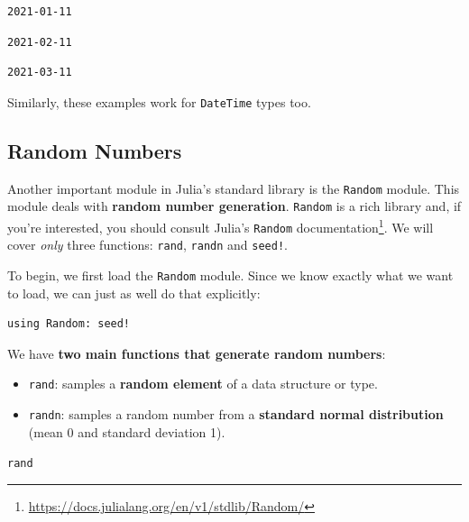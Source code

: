 \documentclass[
  notoc %
]{tufte-book}
\makeatletter
\DeclareRobustCommand{\href}[2]{#2\footnote{\url{#1}}}
\providecommand{\tightlist}{%
  \setlength{\itemsep}{0pt}\setlength{\parskip}{0pt}
}
\newcommand{\passthrough}[1]{#1}
\renewcommand\subsubsection{%
\@startsection{subsubsection}{3}{\z@ }{-3.25ex\@plus -1ex \@minus -.2ex}{1.5ex \@plus .2ex}{\normalfont \normalsize \bfseries }
}
\makeatother
\begin{document}
\begin{lstlisting}[language=Output]
2021-01-11
\end{lstlisting}

\begin{lstlisting}[language=Output]
2021-02-11
\end{lstlisting}

\begin{lstlisting}[language=Output]
2021-03-11
\end{lstlisting}

Similarly, these examples work for \passthrough{\lstinline!DateTime!}
types too.

\hypertarget{sec:random}{%
\subsection{Random Numbers}\label{sec:random}}

Another important module in Julia's standard library is the
\passthrough{\lstinline!Random!} module. This module deals with
\textbf{random number generation}. \passthrough{\lstinline!Random!} is a
rich library and, if you're interested, you should consult
\href{https://docs.julialang.org/en/v1/stdlib/Random/}{Julia's
\passthrough{\lstinline!Random!} documentation}. We will cover
\emph{only} three functions: \passthrough{\lstinline!rand!},
\passthrough{\lstinline!randn!} and \passthrough{\lstinline"seed!"}.

To begin, we first load the \passthrough{\lstinline!Random!} module.
Since we know exactly what we want to load, we can just as well do that
explicitly:

\begin{lstlisting}
using Random: seed!
\end{lstlisting}

We have \textbf{two main functions that generate random numbers}:

\begin{itemize}
\tightlist
\item
  \passthrough{\lstinline!rand!}: samples a \textbf{random element} of a
  data structure or type.
\item
  \passthrough{\lstinline!randn!}: samples a random number from a
  \textbf{standard normal distribution} (mean 0 and standard deviation
  1).
\end{itemize}

\hypertarget{sec:random_rand}{%
\subsubsection{\texorpdfstring{\texttt{rand}}{rand}}\label{sec:random_rand}}
\end{document}

